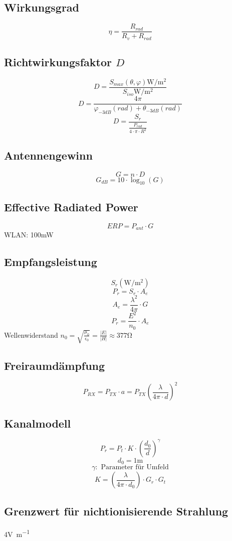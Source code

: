 \documentclass[a4paper, 10pt, fleqn]{article}
\begin{document}
\subsection{Wirkungsgrad}
\[ \eta = \frac{R_{rad}}{R_v + R_{rad}} \]

\subsection{Richtwirkungsfaktor $D$}
\[ D = \frac{S_{max}(\theta, \varphi) \si{\watt\per\square\metre}}
    {S_{iso} \si{\watt\per\square\metre}} \]
\[ D = \frac{4 \pi}{\varphi_{-3dB}(rad) + \theta_{-3dB}(rad)} \]
\[ D = \frac{S_r}{\frac{P_{rad}}{4 \cdot \pi \cdot R^2}} \]

\subsection{Antennengewinn}
\[ G = n \cdot D \]
\[ G_{dB} = 10 \cdot \log_{10}(G) \]

\subsection{Effective Radiated Power}
\[ ERP = P_{ant} \cdot G \]
WLAN: 100mW

\subsection{Empfangsleistung}
\[ S_r (\si{\watt\per\square\metre}) \]
\[ P_r = S_r \cdot A_e \]
\[ A_e = \frac{\lambda^2}{4 \pi} \cdot G \]
\[ P_r = \frac{E^2}{n_0} \cdot A_e \]
Wellenwiderstand $n_0 = \sqrt{\frac{\mu_0}{\epsilon_0}} 
= \frac{|E|}{|H|} \approx 377\si{\ohm}$

\subsection{Freiraumdämpfung}
\[ P_{RX} = P_{TX} \cdot a = P_{TX} \left(\frac{\lambda}{4 \pi \cdot d}\right)^2 \]

\subsection{Kanalmodell}
\[ P_r = P_t \cdot K \cdot \left(\frac{d_0}{d}\right)^\gamma \]
\[ d_0 = 1\si{\metre} \]
\[ \gamma: \text{ Parameter für Umfeld} \]
\[ K = \left(\frac{\lambda}{4 \pi \cdot d_0}\right) \cdot G_r \cdot G_t \]

\subsection{Grenzwert für nichtionisierende Strahlung}
4\si{\volt\per\metre}
\end{document}
